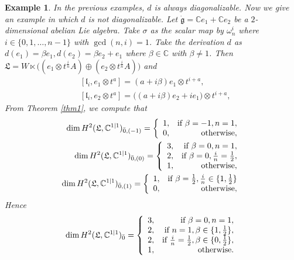 \documentclass[1p]{elsarticle}
\numberwithin{equation}{section}
\def\dg{\dot{\mathfrak{g}}}
\def\fL{\mathfrak{L}}
\def\bC{\mathbb{C}}
\def\fl{\mathfrak{l}}
\newtheorem{exam}{Example}
\begin{document}
\begin{exam} In the previous examples, $d$ is always diagonalizable. Now we give an example in which $d$ is not diagonalizable. Let $\dg=\bC e_1+\bC e_2$ be a $2$-dimensional abelian Lie  algebra. Take  $\sigma$ as the scalar map by $\omega_n^{i}$ where  $i\in \{0,1,\ldots,n-1\}$ with $\gcd(n,i)=1$. Take the derivation $d$ as  $d(e_1)=\beta e_1,d(e_2)=\beta e_2+e_1$ where $\beta\in\mathbb{C}$ with $\beta\ne1$. Then $\fL=W\ltimes \big((e_1\otimes t^{\frac in}A)\oplus (e_2\otimes t^{\frac {i}n}A)\big)$ and 
	\begin{align*}
		&[\fl_i,e_1\otimes t^a]=(a+i\beta)e_1\otimes t^{i+a},\\
		&[\fl_i,e_2\otimes t^a]=\big((a+i\beta)e_2+ie_1\big)\otimes t^{i+a},
	\end{align*}
	 From Theorem \ref{thm1}, we compute that  
	$$\begin{aligned}
		\dim H^2(\fL,\bC^{1|1})_{\bar 0,(-1)}=\left\{\begin{array}{lr}1,& \text{\rm if }\beta=-1, n=1,\\ 0, &{\rm otherwise}, \end{array}\right. \\
		\dim H^2(\fL,\bC^{1|1})_{\bar 0,(0)}=\left\{\begin{array}{lr}3,& \text{\rm if }\beta=0, n=1,\\
			2,& \text{\rm if }\beta=0,\frac in=\frac 12,\\ 1, &{\rm otherwise}, \end{array}\right.\\
		\dim H^2(\fL,\bC^{1|1})_{\bar 0,(1)}=\left\{\begin{array}{lr} 
			1,& \text{\rm if }\beta= \frac 12,\frac in\in\{1,\frac 12\}\\ 0, &{\rm otherwise}, \end{array}\right.\end{aligned}$$ 
	Hence 
	\begin{equation*} \dim H^2(\fL,\bC^{1|1})_{\bar 0}=\left\{\begin{array}{lr} 3,& \text{\rm if }\beta=0, n=1,
						\\ 2,& \text{\rm if } n=1,\beta\in\{1, \frac12\},
				 				\\ 2,& \text{\rm if }\frac in=\frac 12,\beta\in\{0, \frac 12 \},
			\\ 1,  &{\rm otherwise}.\end{array}\right.\end{equation*}
	

\end{exam}
\end{document}
